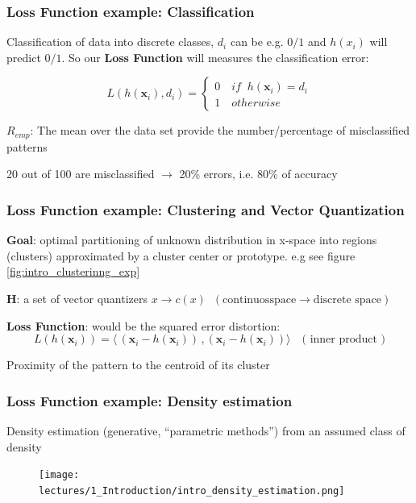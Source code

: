 \documentclass[../main.tex]{subfiles}
\begin{document}
\subsubsection{Loss Function example: Classification}
Classification of data into discrete classes, $d_i$ can be e.g. $0/1$ and $h(x_i)$ will predict $0/1$. So our \textbf{Loss Function} will measures the classification error:

\[
    L(h(\textbf{x}_{i}),d_{i}) = \left\{
                \begin{array}{ll}
                  0 \quad if \;\;h(\textbf{x}_{i}) = d_i\\
                  1 \quad otherwise
                \end{array}
              \right.
\]
 
\begin{center}
    $R_{emp}$: The mean over the data set provide the number/percentage of misclassified patterns
\end{center}
\begin{example}
    20 out of 100 are misclassified $\rightarrow$ 20\% errors, i.e. 80\% of accuracy
\end{example}

\subsubsection{Loss Function example: Clustering and Vector Quantization}
\textbf{Goal}: optimal partitioning of unknown distribution in x-space into regions (clusters) approximated by a cluster center or prototype. e.g see figure \ref{fig:intro_clusterinng_exp}

\noindent \textbf{H}: a set of vector quantizers $ x \rightarrow c(x) \;\;( \text{continuosspace} \rightarrow \text{discrete space})$

\noindent \textbf{Loss Function}: would be the squared error distortion:
$$L(h(\textbf{x}_{i})) = \langle\,(\mathbf{x}_i - h(\mathbf{x}_i))\,, (\mathbf{x}_i - h(\mathbf{x}_i))\rangle \quad \text{( inner product )}$$

Proximity of the pattern to the centroid of its cluster

\subsubsection{Loss Function example: Density estimation}
Density estimation (generative, “parametric methods”) from an assumed class of density
\begin{figure}[H]
    \centering
    \texttt{[image: lectures/1\_Introduction/intro\_density\_estimation.png]}
\end{figure}
\end{document}
